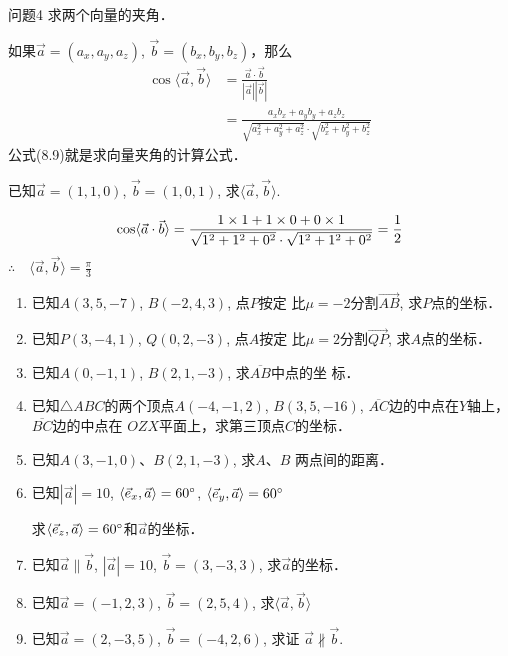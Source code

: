 \begin{blk}
    {问题4}
求两个向量的夹角．
\end{blk}

如果$\vec{a}=(a_x,a_y,a_z)$, $\vec{b}=(b_x,b_y,b_z)$，那么
\begin{equation}
    \begin{split}
\cos\langle \vec{a},\vec{b}\rangle &=\frac{\vec{a}\cdot \vec{b}}{|\vec{a}||\vec{b}|}\\
&=\frac{a_xb_x+a_yb_y+a_zb_z}{\sqrt{a^2_x+a^2_y+a^2_z}\cdot \sqrt{b^2_x+b^2_y+b^2_z}}
    \end{split}
\end{equation}
公式(8.9)就是求向量夹角的计算公式．



\begin{example}
    已知$\vec{a}=(1,1,0)$, $\vec{b}=(1,0,1)$, 
求$\langle \vec{a},\vec{b}\rangle$.
\end{example}

\begin{solution}
\[\cos\langle \vec{a}\cdot \vec{b} \rangle=\dfrac{1\times 1+1\times 0+0\times 1}{\sqrt{1^2+1^2+0^2}\cdot \sqrt{1^2+1^2+0^2}}=\dfrac{1}{2} \]
$\therefore\quad \langle \vec{a},\vec{b}\rangle=\frac{\pi}{3}$    
\end{solution}

\begin{ex}
\begin{enumerate}
    \item 已知$A(3,5,-7)$, $B(-2,4,3)$, 点$P$按定
    比$\mu=-2$分割$\Vec{AB}$, 求$P$点的坐标．
    \item 已知$P(3,-4,1)$, $Q(0,2,-3)$, 点$A$按定
    比$\mu=2$分割$\Vec{QP}$, 求$A$点的坐标．
    \item 已知$A(0,-1,1)$, $B(2,1,-3)$, 求$\overline{AB}$中点的坐
    标．
    \item 已知$\triangle ABC$的两个顶点$A(-4,-1,2)$, $B(3,
    5,-16)$, $\overline{AC}$边的中点在$Y$轴上，
    $\overline{BC}$边的中点在
    $OZX$平面上，求第三顶点$C$的坐标．
    \item 已知$A(3,-1,0)$、$B(2,1,-3)$, 求$A$、$B$
    两点间的距离．
    \item 已知$|\vec{a}|=10$, $\langle \vec{e}_x,\vec{a} \rangle=60^{\circ}$, $\langle \vec{e}_y,\vec{a} \rangle=60^{\circ}$

    求$\langle \vec{e}_z,\vec{a} \rangle=60^{\circ}$和$\vec{a}$的坐标．
\item 已知$\vec{a}\parallel \vec{b}$, $|\vec{a}|=10$, $\vec{b}=(3,-3,3)$, 求$\vec{a}$的坐标．

\item 已知$\vec{a}=(-1,2,3)$, $\vec{b}=(2,5,4)$, 求$\langle \vec{a},\vec{b} \rangle$

\item 已知$\vec{a}=(2,-3,5)$, $\vec{b}=(-4,2,6)$, 求证
$\vec{a}\nparallel \vec{b}$.
\end{enumerate}
\end{ex}

